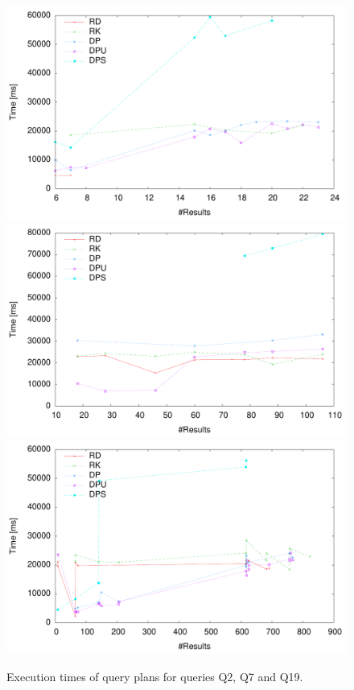 \begin{figure}[htb]
  \centering
  \includegraphics[width=0.8\linewidth]{figs/pareto_exec_0_q2.pdf}
  \includegraphics[width=0.8\linewidth]{figs/pareto_exec_0_q7.pdf}
  \includegraphics[width=0.8\linewidth]{figs/pareto_exec_0_q19.pdf}
  \caption{Execution times of query plans for queries Q2, Q7 and Q19.}
  \label{fig:exec_q7}
\end{figure}
